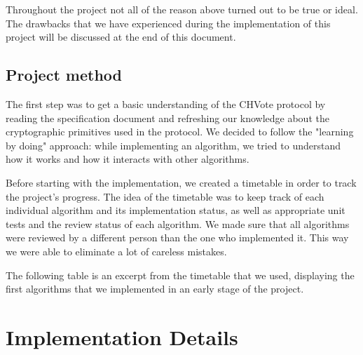 \documentclass[a4paper,12pt]{report}
\begin{document}
Throughout the project not all of the reason above turned out to be true or ideal. The drawbacks that we have experienced during the implementation of this project will be discussed at the end of this document.

\section{Project method}
The first step was to get a basic understanding of the CHVote protocol by reading the specification document and refreshing our knowledge about the cryptographic primitives used in the protocol. We decided to follow the "learning by doing" approach: while implementing an algorithm, we tried to understand how it works and how it interacts with other algorithms.

Before starting with the implementation, we created a timetable in order to track the project's progress. The idea of the timetable was to keep track of each individual algorithm and its implementation status, as well as appropriate unit tests and the review status of each algorithm. We made sure that all algorithms were reviewed by a different person than the one who implemented it. This way we were able to eliminate a lot of careless mistakes.

The following table is an excerpt from the timetable that we used, displaying the first algorithms that we implemented in an early stage of the project.

\noindent
{}

\chapter{Implementation Details}
\end{document}
